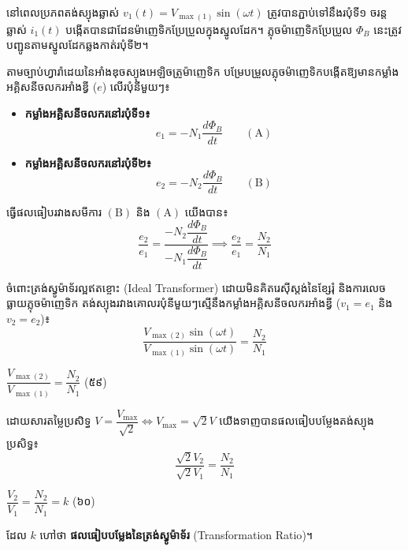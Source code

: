 \vspace{0.6em}
\noindent
{}

\noindent
នៅពេលប្រភពតង់ស្យុងឆ្លាស់ $v_1(t) = V_{\max(1)}\sin(\omega t)$ ត្រូវបានភ្ជាប់ទៅនឹងរបុំទី១ ចរន្តឆ្លាស់ $i_1(t)$ បង្កើតបានជាដែនម៉ាញេទិកប្រែប្រួលក្នុងស្នូលដែក។ ភ្លុចម៉ាញេទិកប្រែប្រួល $\Phi_B$ នេះត្រូវបញ្ជូនតាមស្នូលដែកឆ្លងកាត់របុំទី២។

\vspace{0.3em}
\noindent
តាមច្បាប់ហ្វារ៉ាដេយនៃអាំងឌុចស្យុងអេឡិចត្រូម៉ាញេទិក បម្រែបម្រួលភ្លុចម៉ាញេទិកបង្កើតឱ្យមានកម្លាំងអគ្គិសនីចលករអាំងឌ្វី ($e$) លើរបុំនីមួយៗ៖
\begin{itemize}[itemsep=2pt, topsep=2pt, leftmargin=1.6em]
	\item \textbf{កម្លាំងអគ្គិសនីចលករនៅរបុំទី១៖}
	\[ e_1 = -N_1 \dfrac{d\Phi_B}{dt} \qquad (\text{A}) \]
	\item \textbf{កម្លាំងអគ្គិសនីចលករនៅរបុំទី២៖}
	\[ e_2 = -N_2 \dfrac{d\Phi_B}{dt} \qquad (\text{B}) \]
\end{itemize}

\noindent
ធ្វើផលធៀបរវាងសមីការ $(\text{B})$ និង $(\text{A})$ យើងបាន៖
\[ \dfrac{e_2}{e_1} = \dfrac{-N_2 \dfrac{d\Phi_B}{dt}}{-N_1 \dfrac{d\Phi_B}{dt}} \implies \dfrac{e_2}{e_1} = \dfrac{N_2}{N_1} \]

\vspace{0.3em}
\noindent
ចំពោះត្រង់ស្វូម៉ាទ័រល្អឥតខ្ចោះ ({\englishfont Ideal Transformer}) ដោយមិនគិតរេស៊ីស្តង់នៃខ្សែរុំ និងការលេចធ្លាយភ្លុចម៉ាញេទិក តង់ស្យុងរវាងគោលរបុំនីមួយៗស្មើនឹងកម្លាំងអគ្គិសនីចលករអាំងឌ្វី ($v_1 = e_1$ និង $v_2 = e_2$)៖
\[ \dfrac{V_{\max(2)}\sin(\omega t)}{V_{\max(1)}\sin(\omega t)} = \dfrac{N_2}{N_1} \]

\begin{center}
	$\boxed{\dfrac{V_{\max(2)}}{V_{\max(1)}} = \dfrac{N_2}{N_1}}$ \quad (៥៩)
\end{center}

\noindent
ដោយសារតម្លៃប្រសិទ្ធ $V = \dfrac{V_{\max}}{\sqrt{2}} \iff V_{\max} = \sqrt{2}V$ យើងទាញបានផលធៀបបម្លែងតង់ស្យុងប្រសិទ្ធ៖
\[ \dfrac{\sqrt{2}V_2}{\sqrt{2}V_1} = \dfrac{N_2}{N_1} \]

\begin{center}
	$\boxed{\dfrac{V_2}{V_1} = \dfrac{N_2}{N_1} = k}$ \quad (៦០)
\end{center}
ដែល $k$ ហៅថា \textbf{ផលធៀបបម្លែងនៃត្រង់ស្វូម៉ាទ័រ} ({\englishfont Transformation Ratio})។

\vspace{0.5em}
\noindent
{}

